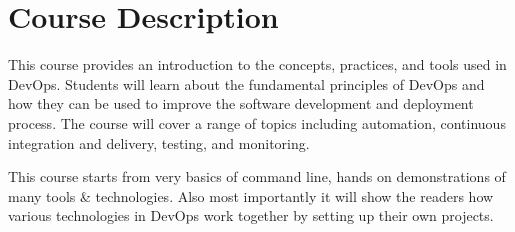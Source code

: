 
\section*{Course Description}



\bigskip
This course provides an introduction to the concepts, practices, and tools used in DevOps. Students will learn about the fundamental principles of DevOps and how they can be used to improve the software development and deployment process. The course will cover a range of topics including automation, continuous integration and delivery, testing, and monitoring.

\bigskip
This course starts from very basics of command line, hands on demonstrations of many tools \& technologies. Also most importantly it will show the readers how various technologies in DevOps work together by setting up their own projects.